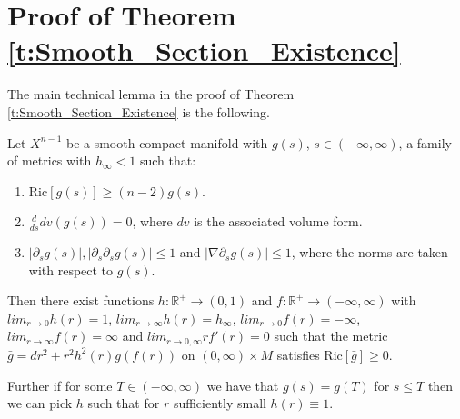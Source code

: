 \documentclass[11pt]{article}
\newcommand{\Ric}{\text{Ric}}
\newcommand{\RR}{\mathds{R}}
\begin{document}
\section{Proof of Theorem \ref{t:Smooth_Section_Existence}}\label{s:ExamplesI}


The main technical lemma in the proof of Theorem \ref{t:Smooth_Section_Existence} is the following.

\begin{lemma}\label{l:ExamTech}
Let $X^{n-1}$ be a smooth compact manifold with $g(s)$, $s\in (-\infty,\infty)$, a family of metrics with $h_\infty<1$ such that:
\begin{enumerate}
\item $\Ric[g(s)]\geq (n-2)g(s)$.
\item $\frac{d}{ds}dv(g(s))=0$, where $dv$ is the associated volume form.
\item $|\partial_{s}g(s)|,|\partial_{s}\partial_{s}g(s)|\leq 1$ and $|\nabla\partial_{s}g(s)|\leq 1$, where the norms are taken with respect to $g(s)$.
\end{enumerate}

Then there exist functions $h:\mathds{R}^{+}\rightarrow(0,1)$ and $f:\RR^{+}\rightarrow(-\infty,\infty)$ with $lim_{r\rightarrow 0}h(r)=1$, $lim_{r\rightarrow \infty}h(r)=h_\infty$, $lim_{r\rightarrow 0}f(r)=-\infty$, $lim_{r\rightarrow \infty}f(r)=\infty$ and $lim_{r\rightarrow 0,\infty}rf'(r)=0$ such that the metric $\bar{g}=dr^{2}+r^{2}h^{2}(r)g(f(r))$ on $(0,\infty)\times M$ satisfies $\Ric[\bar{g}]\geq 0$.

Further if for some $T\in (-\infty,\infty)$ we have that $g(s)=g(T)$ for $s\leq T$ then we can pick $h$ such that for $r$ sufficiently small $h(r)\equiv 1$.
\end{lemma}
\end{document}
